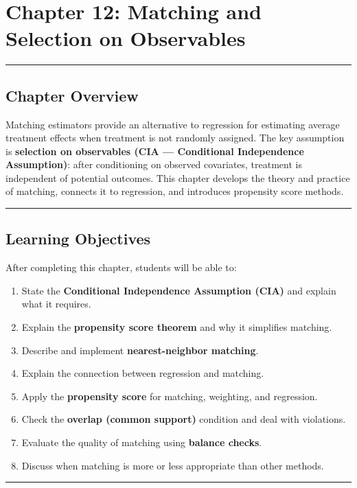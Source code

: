 \chapter{Chapter 12: Matching and Selection on Observables}

\medskip\hrule\medskip

\section{Chapter Overview}

Matching estimators provide an alternative to regression for estimating average treatment effects when treatment is not randomly assigned. The key assumption is \textbf{selection on observables (CIA --- Conditional Independence Assumption)}: after conditioning on observed covariates, treatment is independent of potential outcomes. This chapter develops the theory and practice of matching, connects it to regression, and introduces propensity score methods.

\medskip\hrule\medskip

\section{Learning Objectives}

After completing this chapter, students will be able to:

\begin{enumerate}
\item State the \textbf{Conditional Independence Assumption (CIA)} and explain what it requires.
\item Explain the \textbf{propensity score theorem} and why it simplifies matching.
\item Describe and implement \textbf{nearest-neighbor matching}.
\item Explain the connection between regression and matching.
\item Apply the \textbf{propensity score} for matching, weighting, and regression.
\item Check the \textbf{overlap (common support)} condition and deal with violations.
\item Evaluate the quality of matching using \textbf{balance checks}.
\item Discuss when matching is more or less appropriate than other methods.
\end{enumerate}

\medskip\hrule\medskip

